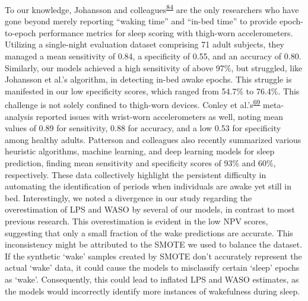 \documentclass[
  10pt,
]{scrbook}
\begin{document}
To our knowledge, Johansson and
colleagues\textsuperscript{\protect\hyperlink{ref-johansson_development_2023}{84}}
are the only researchers who have gone beyond merely reporting ``waking
time'' and ``in-bed time'' to provide epoch-to-epoch performance metrics
for sleep scoring with thigh-worn accelerometers. Utilizing a
single-night evaluation dataset comprising 71 adult subjects, they
managed a mean sensitivity of 0.84, a specificity of 0.55, and an
accuracy of 0.80. Similarly, our models achieved a high sensitivity of
above 97\%, but struggled, like Johansson et al.'s algorithm, in
detecting in-bed awake epochs. This struggle is manifested in our low
specificity scores, which ranged from 54.7\% to 76.4\%. This challenge
is not solely confined to thigh-worn devices. Conley et
al.'s\textsuperscript{\protect\hyperlink{ref-conley_agreement_2019}{69}}
meta-analysis reported issues with wrist-worn accelerometers as well,
noting mean values of 0.89 for sensitivity, 0.88 for accuracy, and a low
0.53 for specificity among healthy adults. Patterson and colleagues also
recently summarized various heuristic algorithms, machine learning, and
deep learning models for sleep prediction, finding mean sensitivity and
specificity scores of 93\% and 60\%, respectively. These data
collectively highlight the persistent difficulty in automating the
identification of periods when individuals are awake yet still in bed.
Interestingly, we noted a divergence in our study regarding the
overestimation of LPS and WASO by several of our models, in contrast to
most previous research. This overestimation is evident in the low NPV
scores, suggesting that only a small fraction of the wake predictions
are accurate. This inconsistency might be attributed to the SMOTE we
used to balance the dataset. If the synthetic `wake' samples created by
SMOTE don't accurately represent the actual `wake' data, it could cause
the models to misclassify certain `sleep' epochs as `wake'.
Consequently, this could lead to inflated LPS and WASO estimates, as the
models would incorrectly identify more instances of wakefulness during
sleep.
\end{document}
